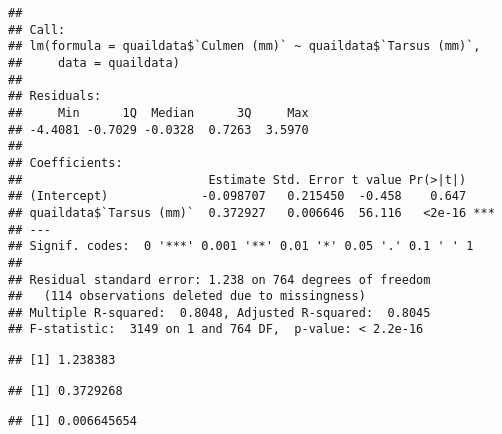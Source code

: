 \documentclass[]{article}
\newenvironment{Shaded}{\begin{snugshade}}{\end{snugshade}}
\newcommand{\DecValTok}[1]{\textcolor[rgb]{0.00,0.00,0.81}{#1}}
\newcommand{\OperatorTok}[1]{\textcolor[rgb]{0.81,0.36,0.00}{\textbf{#1}}}
\newcommand{\NormalTok}[1]{#1}
\begin{document}
\begin{verbatim}
## 
## Call:
## lm(formula = quaildata$`Culmen (mm)` ~ quaildata$`Tarsus (mm)`, 
##     data = quaildata)
## 
## Residuals:
##     Min      1Q  Median      3Q     Max 
## -4.4081 -0.7029 -0.0328  0.7263  3.5970 
## 
## Coefficients:
##                          Estimate Std. Error t value Pr(>|t|)    
## (Intercept)             -0.098707   0.215450  -0.458    0.647    
## quaildata$`Tarsus (mm)`  0.372927   0.006646  56.116   <2e-16 ***
## ---
## Signif. codes:  0 '***' 0.001 '**' 0.01 '*' 0.05 '.' 0.1 ' ' 1
## 
## Residual standard error: 1.238 on 764 degrees of freedom
##   (114 observations deleted due to missingness)
## Multiple R-squared:  0.8048, Adjusted R-squared:  0.8045 
## F-statistic:  3149 on 1 and 764 DF,  p-value: < 2.2e-16
\end{verbatim}

\begin{Shaded}
\end{Shaded}

\begin{verbatim}
## [1] 1.238383
\end{verbatim}

\begin{Shaded}
\end{Shaded}

\begin{verbatim}
## [1] 0.3729268
\end{verbatim}

\begin{Shaded}
\end{Shaded}

\begin{verbatim}
## [1] 0.006645654
\end{verbatim}

\begin{Shaded}
\end{Shaded}
\end{document}
